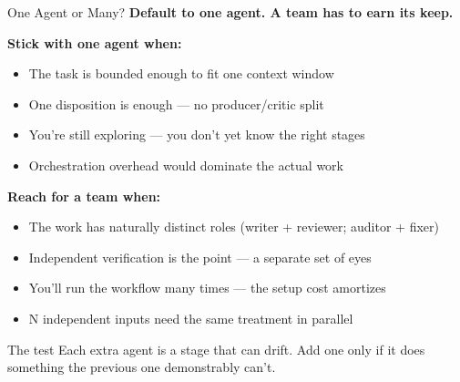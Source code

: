 \documentclass[aspectratio=169, 11pt]{beamer}
\begin{document}
\begin{frame}{One Agent or Many?}
  \textbf{Default to one agent. A team has to earn its keep.}

  \vspace{0.5em}
  \textbf{Stick with one agent when:}
  \begin{itemize}\small
    \item The task is bounded enough to fit one context window
    \item One disposition is enough --- no producer/critic split
    \item You're still exploring --- you don't yet know the right stages
    \item Orchestration overhead would dominate the actual work
  \end{itemize}

  \vspace{0.5em}
  \textbf{Reach for a team when:}
  \begin{itemize}\small
    \item The work has naturally distinct roles (writer + reviewer; auditor + fixer)
    \item Independent verification is the point --- a separate set of eyes
    \item You'll run the workflow many times --- the setup cost amortizes
    \item N independent inputs need the same treatment in parallel
  \end{itemize}

  \vspace{0.4em}
  \begin{block}{The test}
    Each extra agent is a stage that can drift. Add one only if it does something the previous one demonstrably can't.
  \end{block}
\end{frame}
\end{document}
